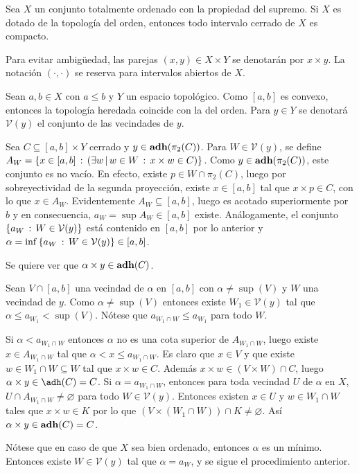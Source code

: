 \begin{Teo}
  Sea $X$ un conjunto totalmente ordenado con la propiedad del supremo. Si $X$
  es dotado de la topología del orden, entonces todo intervalo cerrado de $X$
  es compacto.
\end{Teo}
\begin{Demo}
  Para evitar ambigüedad, las parejas $(x,y)\in X\times Y$ se denotarán por $x\times y$.
  La notación $(\cdot,\cdot)$ se reserva para intervalos abiertos de $X$.

  Sean $a,b\in X$ con $a\leq b$ y $Y$ un espacio topológico. Como $[a,b]$ es convexo,
  entonces la topología heredada coincide con la del orden. Para $y\in Y$ se denotará
  $\mathcal{V}(y)$ el conjunto de las vecindades de $y$.

  Sea $C\subseteq[a,b]\times Y$ cerrado y $y\in\operatorname{\mathrm{\mathbf{adh}}}(\pi_2(C))$. Para $W\in\mathcal{V}(y)$,
  se define $A_W=\set{x\in[a,b]}{\Exists{w}[w\in W]{x\times w\in C}}$. Como
  $y\in\operatorname{\mathrm{\mathbf{adh}}}(\pi_2(C))$, este conjunto es no vacío. En efecto, existe $p\in W\cap\pi_2(C)$,
  luego por sobreyectividad de la segunda proyección, existe $x\in [a,b]$ tal que
  $x\times p\in C$, con lo que $x\in A_W$. Evidentemente $A_W\subseteq[a,b]$,
  luego es acotado superiormente por $b$ y en consecuencia, $a_W=\sup A_W\in [a,b]$ existe.
  Análogamente, el conjunto $\left\{a_W\,:\,W\in\mathcal{V}(y)\right\}$ está contenido en $[a,b]$
  por lo anterior y $\alpha=\inf\left\{a_W\,:\,W\in\mathcal{V}(y)\right\}\in[a,b]$.

  Se quiere ver que $\alpha\times y\in\operatorname{\mathrm{\mathbf{adh}}}(C)$.

  Sean $V\cap [a,b]$ una vecindad de $\alpha$ en $[a,b]$ con $\alpha \neq \sup(V)$
  y $W$ una vecindad de $y$. Como $\alpha \neq \sup(V)$ entonces existe $W_1 \in \mathcal{V}(y)$
  tal que $\alpha \leq a_{W_1} < \sup(V)$. Nótese que $a_{W_1\cap W}\leq a_{W_1}$ para todo $W$.

  Si $\alpha < a_{W_1\cap W}$ entonces $\alpha$ no es una cota superior de $A_{W_1\cap W}$,
  luego existe $x\in A_{W_1\cap W}$ tal que $\alpha < x \leq a_{W_1\cap W}$. Es claro que 
  $x \in V$ y que existe $w \in W_1\cap W \subseteq W$ tal que $x\times w \in C$. 
  Además $x\times w \in (V\times W)\cap C$, luego $\alpha\times y\in \adh(C)=C$. 
  Si $\alpha = a_{W_1\cap W}$, entonces para toda vecindad $U$ de $\alpha$ en $X$, 
  $U\cap A_{W_1\cap W} \neq \varnothing$ para todo $W \in \mathcal{V}(y)$. Entonces existen
  $x \in U$ y $w\in W_1\cap W$ tales que $x\times w \in K$ por lo que 
  $(V\times (W_1\cap W))\cap K\neq\varnothing$. Así $\alpha \times y \in \operatorname{\mathrm{\mathbf{adh}}}(C)=C$.

  Nótese que en caso de que $X$ sea bien ordenado, entonces $\alpha$ es un mínimo. Entonces 
  existe $W \in \mathcal{V}(y)$ tal que $\alpha = a_W$, y se sigue el procedimiento anterior.
\end{Demo}